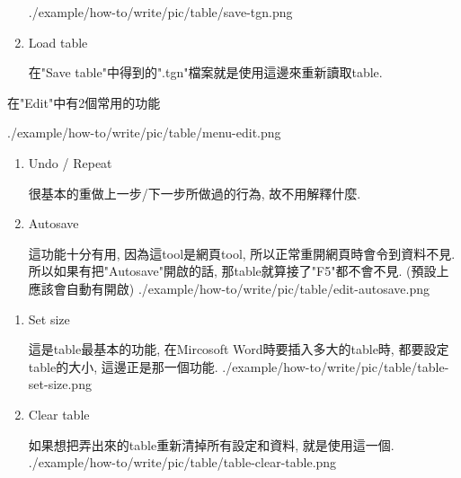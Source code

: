 \begin{enumerate}
{    \InsertCenterImage
      {./example/how-to/write/pic/table/save-tgn.png}

  } %

  \item
  {
    Load table

    在"Save table"中得到的".tgn"檔案就是使用這邊來重新讀取table.
  } %
  \end{enumerate}

\newpage
{}

  在"Edit"中有2個常用的功能

  \InsertCenterImage
    {./example/how-to/write/pic/table/menu-edit.png}

  \begin{enumerate}

  \item
  {
    Undo / Repeat

    很基本的重做上一步/下一步所做過的行為, 故不用解釋什麼.
  } %

  \item
  {
    Autosave

    這功能十分有用, 因為這tool是網頁tool, 所以正常重開網頁時會令到資料不見. 所以如果有把"Autosave"開啟的話, 那table就算接了"F5"都不會不見. (預設上應該會自動有開啟)
    \InsertCenterImage
      {./example/how-to/write/pic/table/edit-autosave.png}
  } %

  \end{enumerate}

\newpage
{}

  \begin{enumerate}

  \item
  {
    Set size

    這是table最基本的功能, 在Mircosoft Word時要插入多大的table時, 都要設定table的大小, 這邊正是那一個功能.
    \InsertCenterImage
      {./example/how-to/write/pic/table/table-set-size.png}
  } %

  \item
  {
    Clear table

    如果想把弄出來的table重新清掉所有設定和資料, 就是使用這一個.
    \InsertCenterImage
      {./example/how-to/write/pic/table/table-clear-table.png}
  } %

  \end{enumerate}

